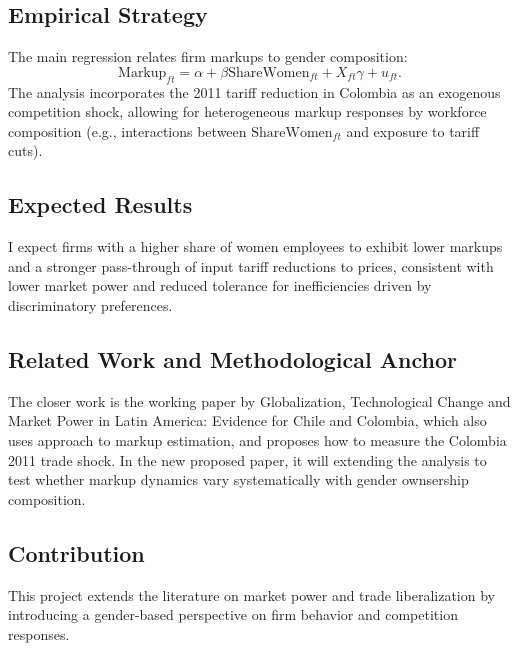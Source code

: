 \documentclass[11pt]{article}
\begin{document}
\subsection*{Empirical Strategy}
The main regression relates firm markups to gender composition:
\begin{equation}
\text{Markup}_{ft} =
\alpha + \beta \text{ShareWomen}_{ft} + X_{ft}\gamma + u_{ft}.
\end{equation}
The analysis incorporates the 2011 tariff reduction in Colombia as an exogenous competition shock, allowing for heterogeneous markup responses by workforce composition (e.g., interactions between $\text{ShareWomen}_{ft}$ and exposure to tariff cuts).

\subsection*{Expected Results}
I expect firms with a higher share of women employees to exhibit lower markups and a stronger pass-through of input tariff reductions to prices, consistent with lower market power and reduced tolerance for inefficiencies driven by discriminatory preferences.

\subsection*{Related Work and Methodological Anchor}
The closer work is the working paper by \cite{bracco_globalization_2025} Globalization, Technological Change and Market Power in Latin America: Evidence for Chile and Colombia, which also uses \cite{loecker_markups_2012} approach to markup estimation, and proposes how to measure the Colombia 2011 trade shock. In the new proposed paper, it will extending the analysis to test whether markup dynamics vary systematically with gender ownsership composition.

\subsection*{Contribution}
This project extends the literature on market power and trade liberalization by introducing a gender-based perspective on firm behavior and competition responses.

\vspace{0.4cm}



\end{document}
